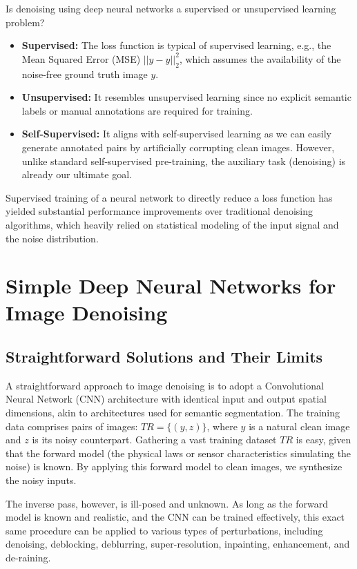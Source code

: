 \begin{insightbox}
Is denoising using deep neural networks a supervised or unsupervised learning problem?
\begin{itemize}
    \item \textbf{Supervised:} The loss function is typical of supervised learning, e.g., the Mean Squared Error (MSE) $||\hat{y} - y||_2^2$, which assumes the availability of the noise-free ground truth image $y$.
    \item \textbf{Unsupervised:} It resembles unsupervised learning since no explicit semantic labels or manual annotations are required for training.
    \item \textbf{Self-Supervised:} It aligns with self-supervised learning as we can easily generate annotated pairs by artificially corrupting clean images. However, unlike standard self-supervised pre-training, the auxiliary task (denoising) is already our ultimate goal.
\end{itemize}
Supervised training of a neural network to directly reduce a loss function has yielded substantial performance improvements over traditional denoising algorithms, which heavily relied on statistical modeling of the input signal and the noise distribution.
\end{insightbox}

\section{Simple Deep Neural Networks for Image Denoising}

\subsection{Straightforward Solutions and Their Limits}
A straightforward approach to image denoising is to adopt a Convolutional Neural Network (CNN) architecture with identical input and output spatial dimensions, akin to architectures used for semantic segmentation. The training data comprises pairs of images: $TR = \{(y, z)\}$, where $y$ is a natural clean image and $z$ is its noisy counterpart. Gathering a vast training dataset $TR$ is easy, given that the forward model (the physical laws or sensor characteristics simulating the noise) is known. By applying this forward model to clean images, we synthesize the noisy inputs. 

The inverse pass, however, is ill-posed and unknown. As long as the forward model is known and realistic, and the CNN can be trained effectively, this exact same procedure can be applied to various types of perturbations, including denoising, deblocking, deblurring, super-resolution, inpainting, enhancement, and de-raining.

